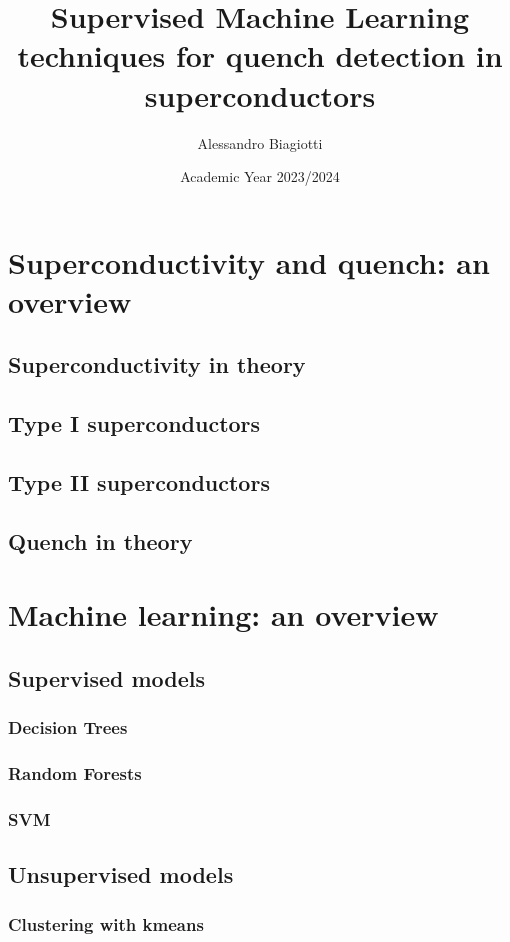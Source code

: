 \documentclass[a4paper]{book}
\title{\textsf{Supervised Machine Learning techniques for quench detection in superconductors}}
\author{Alessandro Biagiotti}
\date{Academic Year 2023/2024}
\begin{document}
\frontmatter

\maketitle

\tableofcontents

\mainmatter

\chapter{Superconductivity and quench: an overview}
\section{Superconductivity in theory}
\section{Type I superconductors}
\section{Type II superconductors}
\section{Quench in theory}
\chapter{Machine learning: an overview}
\section{Supervised models}
\subsection{Decision Trees}
\subsection{Random Forests}
\subsection{SVM}
\section{Unsupervised models}
\subsection{Clustering with k\-means}
\end{document}
